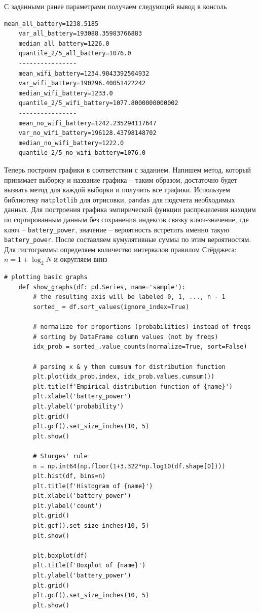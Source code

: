 \documentclass[a4paper, 12pt]{article}
\begin{document}
    С заданными ранее параметрами получаем следующий вывод в консоль
    \begin{lstlisting}[label=mvalsout, caption={Вывод в консоль: посчитанные основные характеристики}]
    mean_all_battery=1238.5185
    var_all_battery=193088.35983766883  
    median_all_battery=1226.0
    quantile_2/5_all_battery=1076.0     
    ----------------
    mean_wifi_battery=1234.9043392504932
    var_wifi_battery=190296.40051422242 
    median_wifi_battery=1233.0
    quantile_2/5_wifi_battery=1077.8000000000002
    ----------------
    mean_no_wifi_battery=1242.235294117647      
    var_no_wifi_battery=196128.43798148702      
    median_no_wifi_battery=1222.0
    quantile_2/5_no_wifi_battery=1076.0
    \end{lstlisting}


    Теперь построим графики в соответствии с заданием.
    Напишем метод, который принимает выборку и название графика -- таким образом, достаточно
    будет вызвать метод для каждой выборки и получить все графики. Используем библиотеку 
    \texttt{matplotlib} для отрисовки, \texttt{pandas} для подсчета необходимых данных.
    Для построения графика эмпирической функции распределения находим
    по сортированным данным без сохранения индексов связку ключ-значение, где ключ --
    \texttt{battery\_{power}}, значение -- вероятность встретить именно такую \texttt{battery\_{power}}.
    После составляем кумулятивные суммы по этим вероятностям. Для гистограммы определяем
    количество интервалов правилом Стёрджеса: $n=1+\log_2{N}$ и округляем вниз
    \begin{lstlisting}[label=graphs, caption={Код для построения необходимых графиков}]
    # plotting basic graphs
    def show_graphs(df: pd.Series, name='sample'):
        # the resulting axis will be labeled 0, 1, ..., n - 1
        sorted_ = df.sort_values(ignore_index=True)

        # normalize for proportions (probabilities) instead of freqs
        # sorting by DataFrame column values (not by freqs)
        idx_prob = sorted_.value_counts(normalize=True, sort=False)

        # parsing x & y then cumsum for distribution function
        plt.plot(idx_prob.index, idx_prob.values.cumsum())
        plt.title(f'Empirical distribution function of {name}')
        plt.xlabel('battery_power')
        plt.ylabel('probability')
        plt.grid()
        plt.gcf().set_size_inches(10, 5)
        plt.show()

        # Sturges' rule
        n = np.int64(np.floor(1+3.322*np.log10(df.shape[0])))
        plt.hist(df, bins=n)
        plt.title(f'Histogram of {name}')
        plt.xlabel('battery_power')
        plt.ylabel('count')
        plt.grid()
        plt.gcf().set_size_inches(10, 5)
        plt.show()

        plt.boxplot(df)
        plt.title(f'Boxplot of {name}')
        plt.ylabel('battery_power')
        plt.grid()
        plt.gcf().set_size_inches(10, 5)
        plt.show()
    \end{lstlisting}
\end{document}
